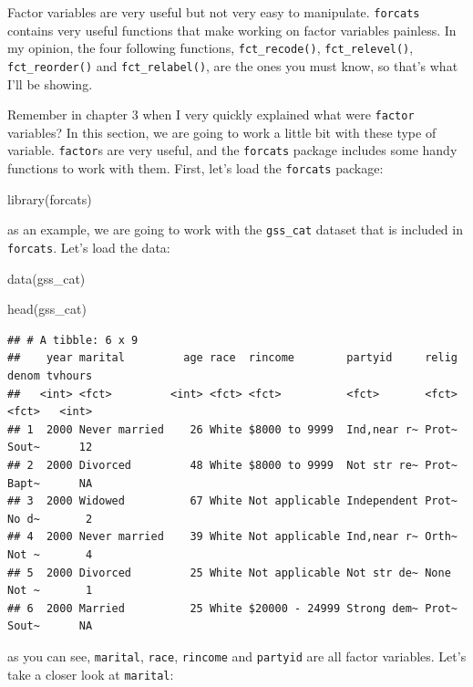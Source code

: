\documentclass[
]{article}
\newenvironment{Shaded}{\begin{snugshade}}{\end{snugshade}}
\newcommand{\FunctionTok}[1]{\textcolor[rgb]{0.00,0.00,0.00}{#1}}
\newcommand{\NormalTok}[1]{#1}
\begin{document}
Factor variables are very useful but not very easy to manipulate. \texttt{forcats} contains very useful
functions that make working on factor variables painless. In my opinion, the four following functions, \texttt{fct\_recode()}, \texttt{fct\_relevel()}, \texttt{fct\_reorder()} and \texttt{fct\_relabel()}, are the ones you must
know, so that's what I'll be showing.

Remember in chapter 3 when I very quickly explained what were \texttt{factor} variables? In this section,
we are going to work a little bit with these type of variable. \texttt{factor}s are very useful, and the
\texttt{forcats} package includes some handy functions to work with them. First, let's load the \texttt{forcats} package:

\begin{Shaded}
\begin{Highlighting}[]
\FunctionTok{library}\NormalTok{(forcats)}
\end{Highlighting}
\end{Shaded}

as an example, we are going to work with the \texttt{gss\_cat} dataset that is included in \texttt{forcats}. Let's
load the data:

\begin{Shaded}
\begin{Highlighting}[]
\FunctionTok{data}\NormalTok{(gss\_cat)}

\FunctionTok{head}\NormalTok{(gss\_cat)}
\end{Highlighting}
\end{Shaded}

\begin{verbatim}
## # A tibble: 6 x 9
##    year marital         age race  rincome        partyid     relig denom tvhours
##   <int> <fct>         <int> <fct> <fct>          <fct>       <fct> <fct>   <int>
## 1  2000 Never married    26 White $8000 to 9999  Ind,near r~ Prot~ Sout~      12
## 2  2000 Divorced         48 White $8000 to 9999  Not str re~ Prot~ Bapt~      NA
## 3  2000 Widowed          67 White Not applicable Independent Prot~ No d~       2
## 4  2000 Never married    39 White Not applicable Ind,near r~ Orth~ Not ~       4
## 5  2000 Divorced         25 White Not applicable Not str de~ None  Not ~       1
## 6  2000 Married          25 White $20000 - 24999 Strong dem~ Prot~ Sout~      NA
\end{verbatim}

as you can see, \texttt{marital}, \texttt{race}, \texttt{rincome} and \texttt{partyid} are all factor variables. Let's take a closer
look at \texttt{marital}:
\end{document}
